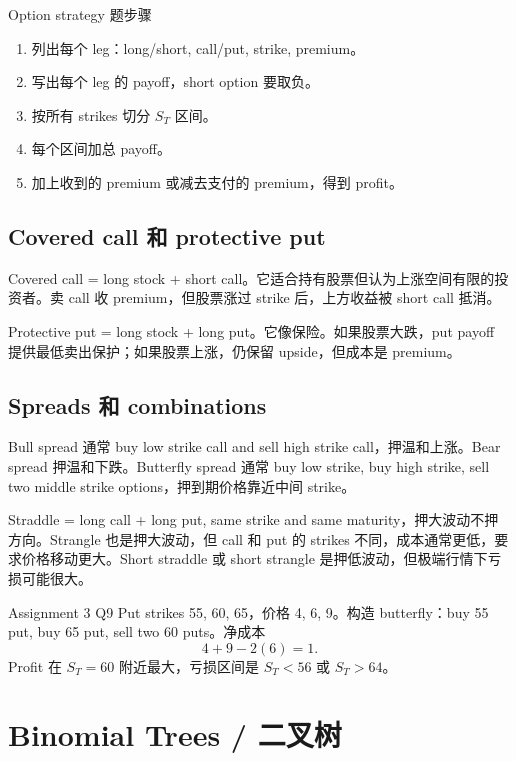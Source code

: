 \begin{workflowbox}{Option strategy 题步骤}
\begin{enumerate}
  \item 列出每个 leg：long/short, call/put, strike, premium。
  \item 写出每个 leg 的 payoff，short option 要取负。
  \item 按所有 strikes 切分 $S_T$ 区间。
  \item 每个区间加总 payoff。
  \item 加上收到的 premium 或减去支付的 premium，得到 profit。
\end{enumerate}
\end{workflowbox}

\subsection{Covered call 和 protective put}
Covered call = long stock + short call。它适合持有股票但认为上涨空间有限的投资者。卖 call 收 premium，但股票涨过 strike 后，上方收益被 short call 抵消。

Protective put = long stock + long put。它像保险。如果股票大跌，put payoff 提供最低卖出保护；如果股票上涨，仍保留 upside，但成本是 premium。

\subsection{Spreads 和 combinations}
Bull spread 通常 buy low strike call and sell high strike call，押温和上涨。Bear spread 押温和下跌。Butterfly spread 通常 buy low strike, buy high strike, sell two middle strike options，押到期价格靠近中间 strike。

Straddle = long call + long put, same strike and same maturity，押大波动不押方向。Strangle 也是押大波动，但 call 和 put 的 strikes 不同，成本通常更低，要求价格移动更大。Short straddle 或 short strangle 是押低波动，但极端行情下亏损可能很大。

\begin{examplebox}{Assignment 3 Q9}
Put strikes 55, 60, 65，价格 4, 6, 9。构造 butterfly：buy 55 put, buy 65 put, sell two 60 puts。净成本
\[
4+9-2(6)=1.
\]
Profit 在 $S_T=60$ 附近最大，亏损区间是 $S_T<56$ 或 $S_T>64$。
\end{examplebox}

\section{Binomial Trees / 二叉树}

